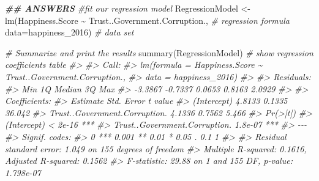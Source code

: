 \documentclass[
]{book}
\newenvironment{Shaded}{\begin{snugshade}}{\end{snugshade}}
\newcommand{\AttributeTok}[1]{\textcolor[rgb]{0.77,0.63,0.00}{#1}}
\newcommand{\CommentTok}[1]{\textcolor[rgb]{0.56,0.35,0.01}{\textit{#1}}}
\newcommand{\DocumentationTok}[1]{\textcolor[rgb]{0.56,0.35,0.01}{\textbf{\textit{#1}}}}
\newcommand{\FunctionTok}[1]{\textcolor[rgb]{0.00,0.00,0.00}{#1}}
\newcommand{\NormalTok}[1]{#1}
\newcommand{\OtherTok}[1]{\textcolor[rgb]{0.56,0.35,0.01}{#1}}
\newcommand{\SpecialCharTok}[1]{\textcolor[rgb]{0.00,0.00,0.00}{#1}}
\theoremstyle{definition}
\theoremstyle{definition}
\theoremstyle{definition}
\theoremstyle{definition}
\theoremstyle{remark}
\begin{document}
\begin{Shaded}
\begin{Highlighting}[]
\DocumentationTok{\#\# ANSWERS}
\CommentTok{\#fit our regression model}
\NormalTok{RegressionModel }\OtherTok{\textless{}{-}} \FunctionTok{lm}\NormalTok{(Happiness.Score }\SpecialCharTok{\textasciitilde{}}\NormalTok{ Trust..Government.Corruption., }\CommentTok{\# regression formula}
              \AttributeTok{data=}\NormalTok{happiness\_2016) }\CommentTok{\# data set}

\CommentTok{\# Summarize and print the results}
\FunctionTok{summary}\NormalTok{(RegressionModel) }\CommentTok{\# show regression coefficients table}
\CommentTok{\#\textgreater{} }
\CommentTok{\#\textgreater{} Call:}
\CommentTok{\#\textgreater{} lm(formula = Happiness.Score \textasciitilde{} Trust..Government.Corruption., }
\CommentTok{\#\textgreater{}     data = happiness\_2016)}
\CommentTok{\#\textgreater{} }
\CommentTok{\#\textgreater{} Residuals:}
\CommentTok{\#\textgreater{}     Min      1Q  Median      3Q     Max }
\CommentTok{\#\textgreater{} {-}3.3867 {-}0.7337  0.0653  0.8163  2.0929 }
\CommentTok{\#\textgreater{} }
\CommentTok{\#\textgreater{} Coefficients:}
\CommentTok{\#\textgreater{}                               Estimate Std. Error t value}
\CommentTok{\#\textgreater{} (Intercept)                     4.8133     0.1335  36.042}
\CommentTok{\#\textgreater{} Trust..Government.Corruption.   4.1336     0.7562   5.466}
\CommentTok{\#\textgreater{}                               Pr(\textgreater{}|t|)    }
\CommentTok{\#\textgreater{} (Intercept)                    \textless{} 2e{-}16 ***}
\CommentTok{\#\textgreater{} Trust..Government.Corruption.  1.8e{-}07 ***}
\CommentTok{\#\textgreater{} {-}{-}{-}}
\CommentTok{\#\textgreater{} Signif. codes:  }
\CommentTok{\#\textgreater{} 0 \textquotesingle{}***\textquotesingle{} 0.001 \textquotesingle{}**\textquotesingle{} 0.01 \textquotesingle{}*\textquotesingle{} 0.05 \textquotesingle{}.\textquotesingle{} 0.1 \textquotesingle{} \textquotesingle{} 1}
\CommentTok{\#\textgreater{} }
\CommentTok{\#\textgreater{} Residual standard error: 1.049 on 155 degrees of freedom}
\CommentTok{\#\textgreater{} Multiple R{-}squared:  0.1616, Adjusted R{-}squared:  0.1562 }
\CommentTok{\#\textgreater{} F{-}statistic: 29.88 on 1 and 155 DF,  p{-}value: 1.798e{-}07}



\end{Highlighting}
\end{Shaded}
\end{document}
